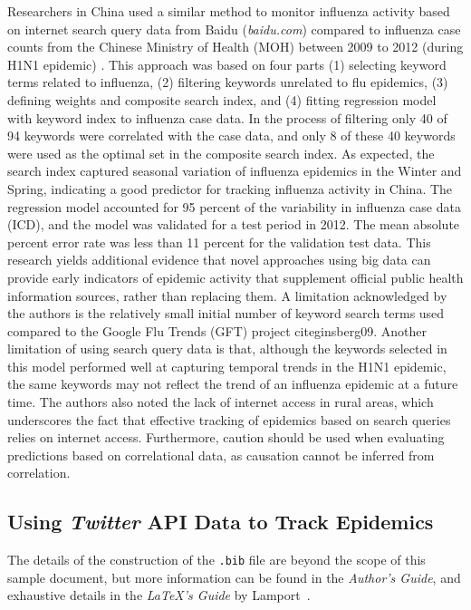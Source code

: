 \documentclass[sigconf]{acmart}
\begin{document}
Researchers in China used a similar method to monitor influenza activity based on
internet search query data from Baidu ({\it baidu.com}) compared to influenza case counts 
from the Chinese Ministry of Health (MOH) between 2009 to 2012 (during H1N1 epidemic) 
\cite{yuan13}. This approach was based on four parts (1) selecting keyword terms related 
to influenza, (2) filtering keywords unrelated to flu epidemics, (3) defining weights 
and composite search index, and (4) fitting regression model with keyword index to 
influenza case data. In the process of filtering only 40 of 94 keywords were correlated 
with the case data, and only 8 of these 40 keywords were used as the optimal set in the 
composite search index. As expected, the search index captured seasonal variation of 
influenza epidemics in the Winter and Spring, indicating a good predictor for tracking 
influenza activity in China. The regression model accounted for 95 percent of the
variability in influenza case data (ICD), and the model was validated for a test period 
in 2012. The mean absolute percent error rate was less than 11 percent for the validation
test data. This research yields additional evidence that novel approaches using big data 
can provide early indicators of epidemic activity that supplement official public health 
information sources, rather than replacing them. A limitation acknowledged by the authors
is the relatively small initial number of keyword search terms used compared to the 
Google Flu Trends (GFT) project cite{ginsberg09}. Another limitation of using search 
query data is that, although the keywords selected in this model performed well at 
capturing temporal trends in the H1N1 epidemic, the same keywords may not reflect the 
trend of an influenza epidemic at a future time. The authors also noted the lack of 
internet access in rural areas, which underscores the fact that effective tracking of 
epidemics based on search queries relies on internet access. Furthermore, caution should 
be used when evaluating predictions based on correlational data, as causation cannot be 
inferred from correlation.

\subsection{Using {\itshape Twitter} API Data to Track Epidemics}

The details of the construction of the \texttt{.bib} file are beyond
the scope of this sample document, but more information can be found
in the \textit{Author's Guide}, and exhaustive details in the \textit{\LaTeX\User's 
Guide} by Lamport~.
\end{document}
